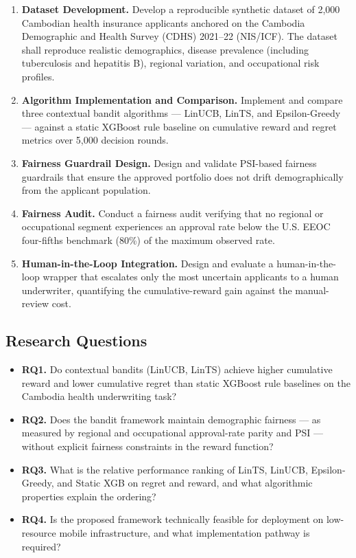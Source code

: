 \begin{enumerate}
\def\labelenumi{\arabic{enumi}.}
\item
  \textbf{Dataset Development.} Develop a reproducible synthetic dataset of 2,000 Cambodian health insurance applicants anchored on the Cambodia Demographic and Health Survey (CDHS) 2021--22 (NIS/ICF). The dataset shall reproduce realistic demographics, disease prevalence (including tuberculosis and hepatitis B), regional variation, and occupational risk profiles.
\item
  \textbf{Algorithm Implementation and Comparison.} Implement and compare three contextual bandit algorithms --- LinUCB, LinTS, and Epsilon-Greedy --- against a static XGBoost rule baseline on cumulative reward and regret metrics over 5,000 decision rounds.
\item
  \textbf{Fairness Guardrail Design.} Design and validate PSI-based fairness guardrails that ensure the approved portfolio does not drift demographically from the applicant population.
\item
  \textbf{Fairness Audit.} Conduct a fairness audit verifying that no regional or occupational segment experiences an approval rate below the U.S. EEOC four-fifths benchmark (80\%) of the maximum observed rate.
\item
  \textbf{Human-in-the-Loop Integration.} Design and evaluate a human-in-the-loop wrapper that escalates only the most uncertain applicants to a human underwriter, quantifying the cumulative-reward gain against the manual-review cost.
\end{enumerate}

\subsection{Research Questions}\label{research-questions}

\begin{itemize}
\item
  \textbf{RQ1.} Do contextual bandits (LinUCB, LinTS) achieve higher cumulative reward and lower cumulative regret than static XGBoost rule baselines on the Cambodia health underwriting task?
\item
  \textbf{RQ2.} Does the bandit framework maintain demographic fairness --- as measured by regional and occupational approval-rate parity and PSI --- without explicit fairness constraints in the reward function?
\item
  \textbf{RQ3.} What is the relative performance ranking of LinTS, LinUCB, Epsilon-Greedy, and Static XGB on regret and reward, and what algorithmic properties explain the ordering?
\item
  \textbf{RQ4.} Is the proposed framework technically feasible for deployment on low-resource mobile infrastructure, and what implementation pathway is required?
\end{itemize}

